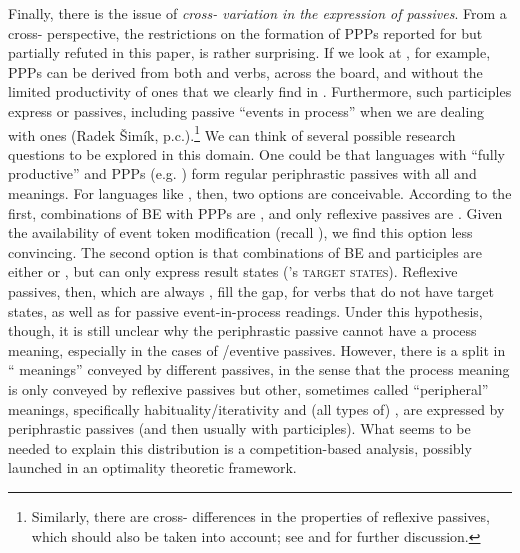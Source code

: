 \documentclass[output=paper,modfonts,newtxmath,hidelinks
\ChapterDOI{10.5281/zenodo.2545513}
]{langscibook}
\begin{document}
Finally, there is the issue of \textit{cross- variation in the expression of passives}. From a cross- perspective, the  restrictions on the formation of PPPs reported for  but partially refuted in this paper, is rather surprising. If we look at , for example, PPPs can be derived from both  and  verbs, across the board, and without the limited productivity of  ones that we clearly find in . Furthermore, such participles express  or  passives, including passive ``events in process'' when we are dealing with  ones (Radek Šimík, p.c.).\footnote{Similarly, there are cross- differences in the properties of reflexive passives, which should also be taken into account; see \citet{fehrmann+10} and \citet{schaefer16} for further discussion.} We can think of several possible research questions to be explored in this domain. One could be that languages with ``fully productive''  and  PPPs (e.g. ) form regular periphrastic  passives with all  and  meanings. For languages like , then, two options are conceivable. According to the first, combinations of BE with PPPs are , and only reflexive passives are . Given the availability of event token modification (recall ), we find this option less convincing. The second option is that combinations of BE and  participles are either  or , but can only express result states (\citeauthor{kratzer00}'s \citeyear{kratzer00} \textsc{target states}). Reflexive passives, then, which are always , fill the gap, for verbs that do not have target states, as well as for passive event-in-process readings. Under this hypothesis, though, it is still unclear why the  periphrastic passive cannot have a process meaning, especially in the cases of /eventive passives. However, there is a split in `` meanings'' conveyed by different passives, in the sense that the process meaning is only conveyed by reflexive passives but other, sometimes called ``peripheral''  meanings, specifically habituality/iterativity and (all types of) , are expressed by periphrastic passives (and then usually with  participles). What seems to be needed to explain this distribution is a competition-based analysis, possibly launched in an optimality theoretic framework. 
\end{document}
